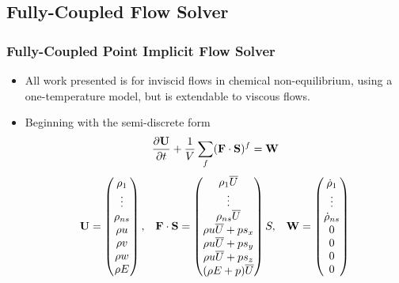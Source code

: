 \documentclass{beamer}
\begin{document}
\subsection{Fully-Coupled Flow Solver}
\begin{frame}
  \frametitle{Fully-Coupled Point Implicit Flow Solver}
  \begin{itemize}
    \item All work presented is for inviscid flows in chemical non-equilibrium,
      using a one-temperature model, but is extendable to viscous flows.
    \item Beginning with the semi-discrete form
    \begin{equation*}
    	\label{inv_flux_fv}
    	\frac{\partial \mathbf U}{\partial t}
    	 + \frac{1}{V}\sum\limits_{f}(\mathbf F\cdot\mathbf S)^f = \mathbf W
    \end{equation*}
    \begin{equation*}
    	\begin{matrix}
    	\mathbf U=\begin{pmatrix}
       		\rho_1\\
    		\vdots \\
    		\rho_{ns} \\
    		\rho u \\
    		\rho v \\
    		\rho w \\
    		\rho E \\
    	\end{pmatrix},      &
     	\mathbf{F \cdot S} = \begin{pmatrix}
    		\rho_1  \overline{U} \\
    		\vdots \\
    		\rho_{ns} \overline{U} \\
    		\rho u \overline{U} + p s_x\\
    		\rho u \overline{U} + p s_y\\
    		\rho u \overline{U} + p s_z\\
    		(\rho E + p) \overline{U} \\
    	\end{pmatrix}S,    &
     	\mathbf W = \begin{pmatrix}
        \dot\rho_1\\
    		\vdots \\
    		\dot\rho_{ns} \\
        0 \\
        0 \\
        0 \\
        0
      \end{pmatrix}

  	\end{matrix}
  \end{equation*}

  \end{itemize}
\end{frame}
\end{document}

